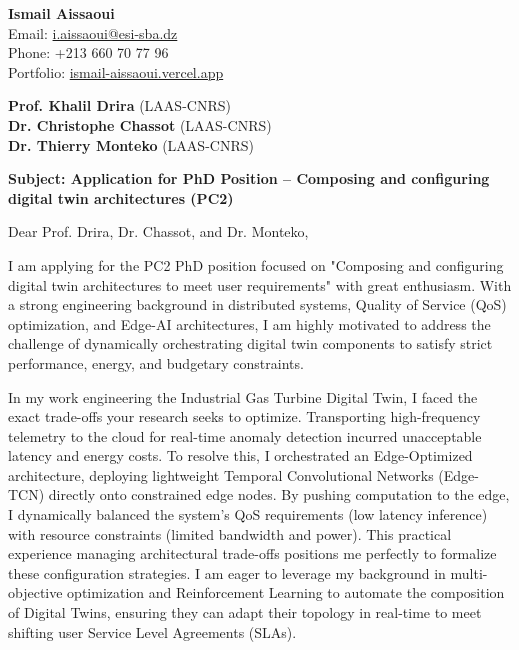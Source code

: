\documentclass[11pt,a4paper]{article}
\begin{document}
\thispagestyle{empty}

\begin{flushright}
\textbf{Ismail Aissaoui} \\
Email: \href{mailto:i.aissaoui@esi-sba.dz}{i.aissaoui@esi-sba.dz} \\
Phone: +213 660 70 77 96 \\
Portfolio: \href{https://ismail-aissaoui.vercel.app}{ismail-aissaoui.vercel.app}
\end{flushright}

\vspace{1em}

\begin{flushleft}
\textbf{Prof. Khalil Drira} (LAAS-CNRS) \\
\textbf{Dr. Christophe Chassot} (LAAS-CNRS) \\
\textbf{Dr. Thierry Monteko} (LAAS-CNRS)
\end{flushleft}

\vspace{1em}
\noindent\textbf{Subject: Application for PhD Position -- Composing and configuring digital twin architectures (PC2)}
\vspace{1em}

\noindent Dear Prof. Drira, Dr. Chassot, and Dr. Monteko,

\vspace{1em}
\noindent
I am applying for the PC2 PhD position focused on "Composing and configuring digital twin architectures to meet user requirements" with great enthusiasm. With a strong engineering background in distributed systems, Quality of Service (QoS) optimization, and Edge-AI architectures, I am highly motivated to address the challenge of dynamically orchestrating digital twin components to satisfy strict performance, energy, and budgetary constraints.

\vspace{0.5em}
\noindent
In my work engineering the Industrial Gas Turbine Digital Twin, I faced the exact trade-offs your research seeks to optimize. Transporting high-frequency telemetry to the cloud for real-time anomaly detection incurred unacceptable latency and energy costs. To resolve this, I orchestrated an Edge-Optimized architecture, deploying lightweight Temporal Convolutional Networks (Edge-TCN) directly onto constrained edge nodes. By pushing computation to the edge, I dynamically balanced the system's QoS requirements (low latency inference) with resource constraints (limited bandwidth and power). This practical experience managing architectural trade-offs positions me perfectly to formalize these configuration strategies. I am eager to leverage my background in multi-objective optimization and Reinforcement Learning to automate the composition of Digital Twins, ensuring they can adapt their topology in real-time to meet shifting user Service Level Agreements (SLAs).
\end{document}
